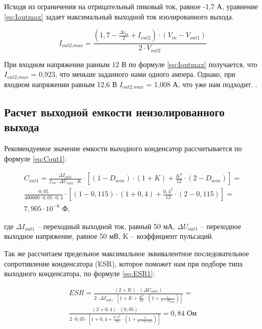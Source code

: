 Исходя из ограничения на отрицательный пиковый ток, равное -1,7 А, уравнение \ref{eq:Ioutmax} задает 
максимальный выходной ток изолированного выхода.

\begin{equation}
   I_{out2.max} = \frac{(1,7 - \frac{\Delta i_{m}}{2} + I_{out2}) \cdot (V_{in} - V_{out1})}{2 \cdot V_{out2}}
\label{eq:Ioutmax}
\end{equation}


При входном напряжении равным 12 В по формуле \ref{eq:Ioutmax} получается, что $I_{out2.max}$ = 0,923, 
что меньше заданного нами одного ампера. Однако, при входном напряжении равным 12,6 В 
$I_{out2.max}$ = 1,008 А, что уже нам подходит. \cite{LMR36520:Aplication Note}. 

\subsection{Расчет выходной емкости неизолированного выхода}
\hspace{1cm} 

Рекомендуемое значение емкости выходного конденсатор рассчитывается по формуле \ref{eq:Cout1}:

\begin{eqnarray}
    C_{out1} =
    \frac{\Delta I_{out1}}{f_{sw} \cdot \Delta U_{out1} \cdot K} \cdot 
    [(1 - D_{min}) \cdot (1 + K) + \frac{K^{2}}{12} \cdot (2 - D_{min})] = \nonumber\\
    \frac{0,05}{400000 \cdot 0,05 \cdot 0,4} \cdot 
    [(1 - 0,115) \cdot (1 + 0,4) + \frac{0,4^{2}}{12} \cdot (2 - 0,115)]  =\nonumber \\
    7,905 \cdot 10^{-6} \text{ Ф, }
    \label{eq:Cout1}
\end{eqnarray}

где $\Delta I_{out1}$ -- переходный выходной ток, равный 50 мА, $\Delta U_{out1}$ -- переходное выходное 
напряжение, равное 50 мВ,
K -- коэффициент пульсаций. 

Так же рассчитаем предельное максимальное эквивалентное последовательное сопротивление конденсатора (ESR),
 которое поможет 
нам при подборе типа выходного конденсатора, по формуле \ref{eq:ESR1}:

\begin{eqnarray}
    ESR = \frac{(2 + K) \cdot (\Delta U_{out1})}{2 \cdot \Delta I_{out1} \cdot 
    [1 + K + \frac{K^{2}}{12} \cdot (1 + \frac{1}{1 - D_{min}})]} = \nonumber\\
    \frac{(2 + 0,4) \cdot (0,05)}{2 \cdot 0,05 \cdot 
    [1 + 0,4 + \frac{0,4^{2}}{12} \cdot (1 + \frac{1}{1 - 0,115})]} =
    0,84 \text{ Ом}
    \label{eq:ESR1}
\end{eqnarray}

